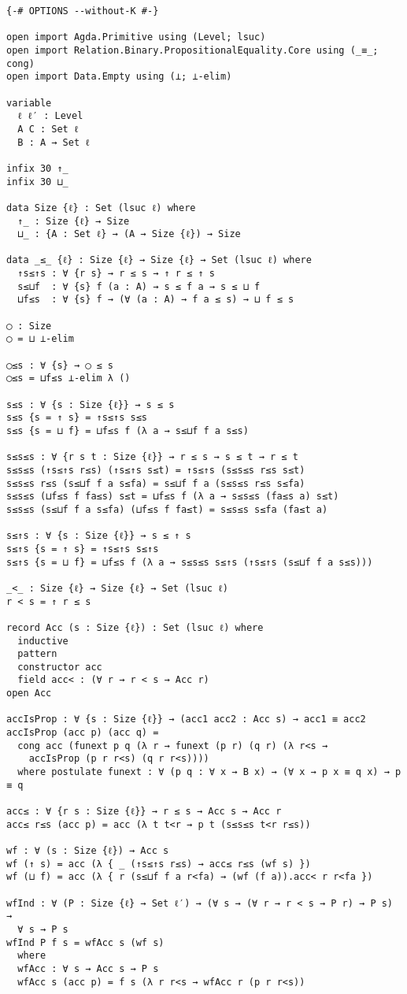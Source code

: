 \documentclass[acmsmall,review,anonymous]{acmart}\settopmatter{printfolios=true,printccs=false,printacmref=false}
\begin{document}
\begin{verbatim}
{-# OPTIONS --without-K #-}

open import Agda.Primitive using (Level; lsuc)
open import Relation.Binary.PropositionalEquality.Core using (_≡_; cong)
open import Data.Empty using (⊥; ⊥-elim)

variable
  ℓ ℓ′ : Level
  A C : Set ℓ
  B : A → Set ℓ

infix 30 ↑_
infix 30 ⊔_

data Size {ℓ} : Set (lsuc ℓ) where
  ↑_ : Size {ℓ} → Size
  ⊔_ : {A : Set ℓ} → (A → Size {ℓ}) → Size

data _≤_ {ℓ} : Size {ℓ} → Size {ℓ} → Set (lsuc ℓ) where
  ↑s≤↑s : ∀ {r s} → r ≤ s → ↑ r ≤ ↑ s
  s≤⊔f  : ∀ {s} f (a : A) → s ≤ f a → s ≤ ⊔ f
  ⊔f≤s  : ∀ {s} f → (∀ (a : A) → f a ≤ s) → ⊔ f ≤ s

◯ : Size
◯ = ⊔ ⊥-elim

◯≤s : ∀ {s} → ◯ ≤ s
◯≤s = ⊔f≤s ⊥-elim λ ()

s≤s : ∀ {s : Size {ℓ}} → s ≤ s
s≤s {s = ↑ s} = ↑s≤↑s s≤s
s≤s {s = ⊔ f} = ⊔f≤s f (λ a → s≤⊔f f a s≤s)

s≤s≤s : ∀ {r s t : Size {ℓ}} → r ≤ s → s ≤ t → r ≤ t
s≤s≤s (↑s≤↑s r≤s) (↑s≤↑s s≤t) = ↑s≤↑s (s≤s≤s r≤s s≤t)
s≤s≤s r≤s (s≤⊔f f a s≤fa) = s≤⊔f f a (s≤s≤s r≤s s≤fa)
s≤s≤s (⊔f≤s f fa≤s) s≤t = ⊔f≤s f (λ a → s≤s≤s (fa≤s a) s≤t)
s≤s≤s (s≤⊔f f a s≤fa) (⊔f≤s f fa≤t) = s≤s≤s s≤fa (fa≤t a)

s≤↑s : ∀ {s : Size {ℓ}} → s ≤ ↑ s
s≤↑s {s = ↑ s} = ↑s≤↑s s≤↑s
s≤↑s {s = ⊔ f} = ⊔f≤s f (λ a → s≤s≤s s≤↑s (↑s≤↑s (s≤⊔f f a s≤s)))

_<_ : Size {ℓ} → Size {ℓ} → Set (lsuc ℓ)
r < s = ↑ r ≤ s

record Acc (s : Size {ℓ}) : Set (lsuc ℓ) where
  inductive
  pattern
  constructor acc
  field acc< : (∀ r → r < s → Acc r)
open Acc

accIsProp : ∀ {s : Size {ℓ}} → (acc1 acc2 : Acc s) → acc1 ≡ acc2
accIsProp (acc p) (acc q) =
  cong acc (funext p q (λ r → funext (p r) (q r) (λ r<s →
    accIsProp (p r r<s) (q r r<s))))
  where postulate funext : ∀ (p q : ∀ x → B x) → (∀ x → p x ≡ q x) → p ≡ q

acc≤ : ∀ {r s : Size {ℓ}} → r ≤ s → Acc s → Acc r
acc≤ r≤s (acc p) = acc (λ t t<r → p t (s≤s≤s t<r r≤s))

wf : ∀ (s : Size {ℓ}) → Acc s
wf (↑ s) = acc (λ { _ (↑s≤↑s r≤s) → acc≤ r≤s (wf s) })
wf (⊔ f) = acc (λ { r (s≤⊔f f a r<fa) → (wf (f a)).acc< r r<fa })

wfInd : ∀ (P : Size {ℓ} → Set ℓ′) → (∀ s → (∀ r → r < s → P r) → P s) →
  ∀ s → P s
wfInd P f s = wfAcc s (wf s)
  where
  wfAcc : ∀ s → Acc s → P s
  wfAcc s (acc p) = f s (λ r r<s → wfAcc r (p r r<s))
\end{verbatim}
\end{document}
